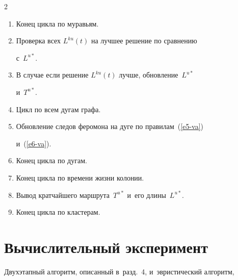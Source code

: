 \begin{multicols}{2}
\begin{enumerate}[1.]
\item Конец цикла по муравьям.\\[-13.5pt]

\item Проверка всех $L^{ku}(t)$ на лучшее решение по сравнению

с~$L^{u*}$.\\[-13.5pt]

\item В случае если решение $L^{ku}(t)$ лучше, обновление~$L^{u*}$

и~$T^{u*}$.\\[-13.5pt]

\item Цикл по всем дугам графа.\\[-13.5pt]

\item Обновление следов феромона на дуге по правилам~(\ref{e5-va})

и~(\ref{e6-va}).\\[-13.5pt]

\item Конец цикла по дугам.\\[-13.5pt]

\item Конец цикла по времени жизни колонии.\\[-13.5pt]

\item Вывод кратчайшего маршрута~$T^{u*}$ и~его длины~$L^{u*}$.\\[-13.5pt]

\item Конец цикла по кластерам.

\end{enumerate}



\vspace*{-9pt}







\section{Вычислительный эксперимент}



\vspace*{-2pt}



     Двухэтапный алгоритм, описанный в~разд.~4, и~эвристический алгоритм,


\end{multicols}
